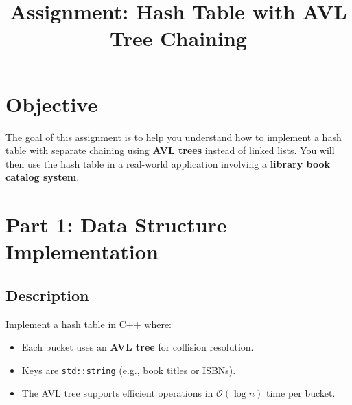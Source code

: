 \documentclass[11pt]{article}
\title{\textbf{Assignment: Hash Table with AVL Tree Chaining}}
\author{}
\date{}
\begin{document}
\maketitle

\section*{Objective}
The goal of this assignment is to help you understand how to implement a hash table with separate chaining using \textbf{AVL trees} instead of linked lists. You will then use the hash table in a real-world application involving a \textbf{library book catalog system}.

\section*{Part 1: Data Structure Implementation}

\subsection*{Description}
Implement a hash table in C++ where:
\begin{itemize}
  \item Each bucket uses an \textbf{AVL tree} for collision resolution.
  \item Keys are \texttt{std::string} (e.g., book titles or ISBNs).
  \item The AVL tree supports efficient operations in $\mathcal{O}(\log n)$ time per bucket.
\end{itemize}
\end{document}
